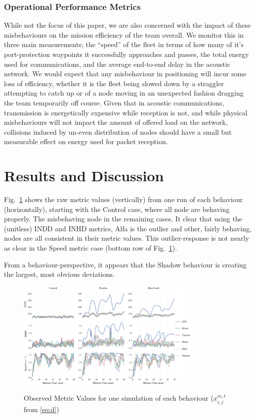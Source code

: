 \documentclass[conference,compsoc,letterpaper]{IEEEtran}
\begin{document}
\subsubsection{Operational Performance Metrics}
While not the focus of this paper, we are also concerned with the impact of these misbehaviours on the mission efficiency of the team overall.
We monitor this in three main measurements; the ``speed'' of the fleet in terms of how many of it's port-protection waypoints it successfully approaches and passes, the total energy used for communications, and the average end-to-end delay in the acoustic network.
We would expect that any misbehaviour in positioning will incur some loss of efficiency, whether it is the fleet being slowed down by a straggler attempting to catch up or of a node moving in an unexpected fashion dragging the team temporarily off course.
Given that in acoustic communications, transmission is energetically expensive while reception is not, and while physical misbehaviours will not impact the amount of offered load on the network, collisions induced by un-even distribution of nodes should have a small but measurable effect on energy used for packet reception.

\section{Results and Discussion}
Fig.~\ref{fig:metric_values} shows the raw metric values (vertically) from one run of each behaviour (horizontally), starting with the Control case, where all node are behaving properly.
The misbehaving node in the remaining cases.
It clear that using the (unitless) INDD and INHD metrics, Alfa is the outlier and other, fairly behaving, nodes are all consistent in their metric values.
This outlier-response is not nearly as clear in the Speed metric case (bottom row of Fig.~\ref{fig:metric_values}).

From a behaviour-perspective, it appears that the Shadow behaviour is creating the largest, most obvious deviations.

\begin{figure}
  \centering
  \includegraphics[width=0.8\textwidth]{Metric_Values}
  \caption{Observed Metric Values for one simulation of each behaviour ($x_{i,j}^{m,t}$ from \eqref{eq:d})}
  \label{fig:metric_values}
\end{figure}
\end{document}
